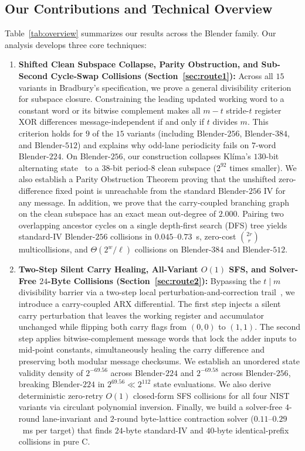 \documentclass[11pt,a4paper]{article}
\theoremstyle{definition}
\theoremstyle{remark}
\begin{document}
\subsection{Our Contributions and Technical Overview}
Table~\ref{tab:overview} summarizes our results across the Blender family. Our analysis develops three core techniques:
\begin{enumerate}[leftmargin=2em]
    \item \textbf{Shifted Clean Subspace Collapse, Parity Obstruction, and Sub-Second Cycle-Swap Collisions (Section~\ref{sec:route1}):} Across all $15$ variants in Bradbury's specification, we prove a general divisibility criterion for subspace closure. Constraining the leading updated working word to a constant word or its bitwise complement makes all $m - t$ stride-$t$ register XOR differences message-independent if and only if $t$ divides $m$. This criterion holds for $9$ of the $15$ variants (including Blender-$256$, Blender-$384$, and Blender-$512$) and explains why odd-lane periodicity fails on $7$-word Blender-$224$. On Blender-$256$, our construction collapses Kl\'{i}ma's $130$-bit alternating state~\cite{Kli09} to a $38$-bit period-$8$ clean subspace ($2^{92}$ times smaller). We also establish a Parity Obstruction Theorem proving that the unshifted zero-difference fixed point is unreachable from the standard Blender-$256$ IV for any message. In addition, we prove that the carry-coupled branching graph on the clean subspace has an exact mean out-degree of $2.000$. Pairing two overlapping ancestor cycles on a single depth-first search (DFS) tree yields standard-IV Blender-$256$ collisions in $0.045\text{--}0.73$~s, zero-cost $\binom{2r}{r}$ multicollisions, and $\Theta(2^w/\ell)$ collisions on Blender-$384$ and Blender-$512$.
    \item \textbf{Two-Step Silent Carry Healing, All-Variant $O(1)$ SFS, and Solver-Free $24$-Byte Collisions (Section~\ref{sec:route2}):} Bypassing the $t \mid m$ divisibility barrier via a two-step local perturbation-and-correction trail~\cite{CJ98}, we introduce a carry-coupled ARX differential. The first step injects a silent carry perturbation that leaves the working register and accumulator unchanged while flipping both carry flags from $(0,0)$ to $(1,1)$. The second step applies bitwise-complement message words that lock the adder inputs to mid-point constants, simultaneously healing the carry difference and preserving both modular message checksums. We establish an unordered state validity density of $2^{-69.56}$ across Blender-$224$ and $2^{-69.58}$ across Blender-$256$, breaking Blender-$224$ in $2^{69.56} \ll 2^{112}$ state evaluations. We also derive deterministic zero-retry $O(1)$ closed-form SFS collisions for all four NIST variants via circulant polynomial inversion. Finally, we build a solver-free $4$-round lane-invariant and $2$-round byte-lattice contraction solver ($0.11\text{--}0.29$~ms per target) that finds $24$-byte standard-IV and $40$-byte identical-prefix collisions in pure C.

\end{enumerate}
\end{document}
